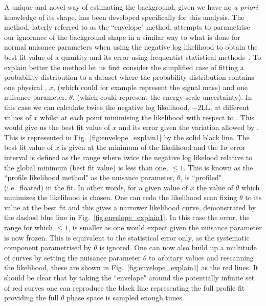 A unique and novel way of estimating the background, given we have no \emph{a priori} knowledge of its shape, has been developed specifically for this analysis. The method, laterly referred to as the ``envelope" method, attempts to parametrise our ignorance of the background shape in a similar way to what is done for normal nuisance parameters when using the negative log likelihood to obtain the best fit value of a quantity and its error using frequentist statistical methods~\cite{FredJames}. To explain better the method let us first consider the simplified case of fitting a probability distribution to a dataset where the probability distribution contains one physical \POI, $x$, (which could for example represent the signal mass) and one nuisance parameter, $\theta$, (which could represent the energy scale uncertainty). In this case we can calculate twice the negative log likelihood, $-2$LL, at different values of $x$ whilst at each point minimising the likelihood with respect to \theta. 
This would give us the best fit value of $x$ and its error given the variation allowed by \theta. This is represented in Fig.~\ref{fig:envelope_explain1} by the solid black line. The best fit value of $x$ is given at the minimum of the likelihood and the 1$\sigma$ error interval is defined as the range where twice the negative log likelood relative to the global minimum (best fit value) is less than one, \NLL$\leq1$. This is known as the ``profile likelihood method" as the nuisance parameter, $\theta$, is ``profiled" (i.e.\ floated) in the fit. In other words, for a given value of $x$ the value of $\theta$ which minimizes the likelihood is chosen. One can redo the likelihood scan fixing $\theta$ to its value at the best fit and this gives a narrower likelihood curve, demonstrated by the dashed blue line in Fig.~\ref{fig:envelope_explain1}. In this case the error, the range for which \NLL$\leq1$, is smaller as one would expect given the nuisance parameter is now frozen. This is equivalent to the statistical error only, as the systematic component parametrised by $\theta$ is ignored. One can now also build up a multitude of curves by setting the nuisance parameter $\theta$ to arbitary values and rescanning the likelihood, these are shown in Fig.~\ref{fig:envelope_explain1} as the red lines. It should be clear that by taking the ``envelope" around the potentially infinite set of red curves one can reproduce the black line representing the full profile fit providing the full $\theta$ phase space is sampled enough times. 

